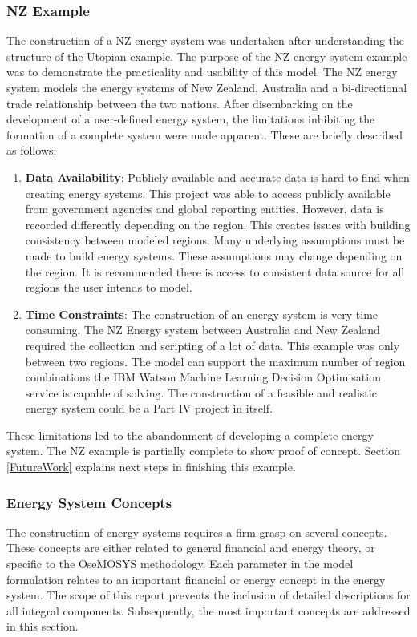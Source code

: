 \documentclass[12pt]{article}
\begin{document}
\subsubsection{NZ Example} \label{NZES}
The construction of a NZ energy system was undertaken after understanding the structure of the Utopian example.
The purpose of the NZ energy system example was to demonstrate the practicality and usability of this model.
The NZ energy system models the energy systems of New Zealand, Australia and a bi-directional trade relationship between the two nations.
After disembarking on the development of a user-defined energy system, the limitations inhibiting the formation of a complete system were made apparent.
These are briefly described as follows:
\begin{enumerate}
	\item \textbf{Data Availability}: Publicly available and accurate data is hard to find when creating energy systems.
	This project was able to access publicly available from government agencies and global reporting entities.
	However, data is recorded differently depending on the region.
	This creates issues with building consistency between modeled regions.
	Many underlying assumptions must be made to build energy systems.
	These assumptions may change depending on the region.
	It is recommended there is access to consistent data source for all regions the user intends to model.

	\item \textbf{Time Constraints}: The construction of an energy system is very time consuming.
	The NZ Energy system between Australia and New Zealand required the collection and scripting of a lot of data.
	This example was only between two regions.
	The model can support the maximum number of region combinations the IBM Watson Machine Learning Decision Optimisation service is capable of solving.
	The construction of a feasible and realistic energy system could be a Part IV project in itself.
\end{enumerate}
These limitations led to the abandonment of developing a complete energy system.
The NZ example is partially complete to show proof of concept.
Section \ref{FutureWork} explains next steps in finishing this example.

\subsubsection{Energy System Concepts}
The construction of energy systems requires a firm grasp on several concepts. 
These concepts are either related to general financial and energy theory, or specific to the OseMOSYS methodology.
Each parameter in the model formulation relates to an important financial or energy concept in the energy system.
The scope of this report prevents the inclusion of detailed descriptions for all integral components.
Subsequently, the most important concepts are addressed in this section. 
\end{document}
